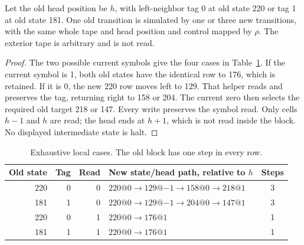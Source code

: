 \begin{lemma}\label{lem:four}
Let the old head position be $h$, with left-neighbor tag 0 at old state 220
or tag 1 at old state 181. One old transition is simulated by one or three
new transitions, with the same whole tape and head position and control
mapped by $\rho$. The exterior tape is arbitrary and is not read.
\end{lemma}
\begin{proof}
The two possible current symbols give the four cases in
Table~\ref{tab:local}. If the current symbol is 1, both old states have
the identical row to 176, which is retained. If it is 0, the new 220 row
moves left to 129. That helper reads and preserves the tag, returning right
to 158 or 204. The current zero then selects the required old target 218
or 147. Every write preserves the symbol read. Only cells $h-1$ and $h$
are read; the head ends at $h+1$, which is not read inside the block.
No displayed intermediate state is halt.
\end{proof}

\begin{table}[htbp]
\centering\small
\begin{tabular}{rrrlc}
\toprule
Old state & Tag & Read & New state/head path, relative to $h$ & Steps\\
\midrule
220&0&0&$220@0\to129@{-1}\to158@0\to218@1$&3\\
181&1&0&$220@0\to129@{-1}\to204@0\to147@1$&3\\
220&0&1&$220@0\to176@1$&1\\
181&1&1&$220@0\to176@1$&1\\
\bottomrule
\end{tabular}
\caption{Exhaustive local cases. The old block has one step in every row.}
\label{tab:local}
\end{table}

